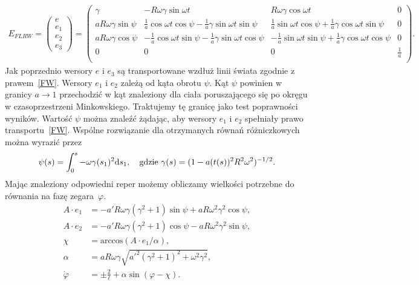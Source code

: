 \begin{align}\nonumber
E_{FLRW} = 
\begin{pmatrix}
e\\
e_1\\
e_2\\
e_3
\end{pmatrix}
=
\begin{pmatrix}
\gamma 	& -R\omega\gamma\sin\omega t 	
& R\omega\gamma\cos\omega t & 0 \\
a R\omega\gamma \sin \psi	
& \frac{1}{a} \cos\omega t \cos\psi - \frac{1}{a}\gamma \sin\omega t \sin\psi
& \frac{1}{a} \sin\omega t \cos\psi + \frac{1}{a}\gamma \cos\omega t \sin\psi
& 0 \\
a R\omega\gamma \cos \psi & -\frac{1}{a} \cos\omega t \sin\psi - 
\frac{1}{a}\gamma \sin\omega t \cos\psi
& -\frac{1}{a} \sin\omega t \sin\psi + 
\frac{1}{a}\gamma \cos\omega t \cos\psi		 & 0 \\
0&	0	& 0	& \frac{1}{a} \\
\end{pmatrix}.
\end{align}
Jak poprzednio wersory $e$ i $e_3$ są transportowane wzdłuż linii świata 
zgodnie z prawem~\eqref{FW}. Wersory $e_1$ i $e_2$ 
zależą od kąta obrotu $\psi$. Kąt $\psi$ powinien w granicy $a\to 1$ 
przechodzić w kąt znaleziony 
dla ciała poruszającego się po okręgu w czasoprzestrzeni Minkowskiego.
Traktujemy tę granicę jako test poprawności wyników. 
Wartość $\psi$ można znaleźć 
żądając, aby wersory $e_1$ i $e_2$ spełniały prawo transportu~\eqref{FW}. 
Wspólne rozwiązanie dla otrzymanych równań różniczkowych 
można wyrazić przez
\begin{align}\nonumber
\psi(s) =\int_0^s -\omega \gamma(s_1)^2  \text{d} s_1 , \quad 
\text{gdzie } \gamma(s) = (1-a(t(s))^2R^2\omega^2)^{-1/2}.
\end{align}
Mając znaleziony odpowiedni reper możemy obliczamy wielkości
potrzebne do równania na fazę zegara~$\varphi$.
\begin{align*}\nonumber
A\cdot e_1 &= -a'R\omega \gamma \left( \gamma^2+1 \right)\sin\psi
 + a R \omega^2\gamma^2\cos\psi ,       \\
A\cdot e_2 &= -a'R\omega \gamma \left( \gamma^2+1 \right)\cos\psi
 - a R \omega^2 \gamma^2 \sin \psi  ,     \nonumber  \\
\chi & = \text{arccos} \left( A\cdot e_1 / \alpha \right) ,
\\
\alpha & = 
a R \omega \gamma \sqrt{a'^2 \left(\gamma ^2+1\right)^2
 +   \omega^2\gamma^2} ,
\\
\dot{\varphi} &= \pm \frac{2}{\ell} + \alpha \sin (\varphi - \chi) .
\end{align*}
